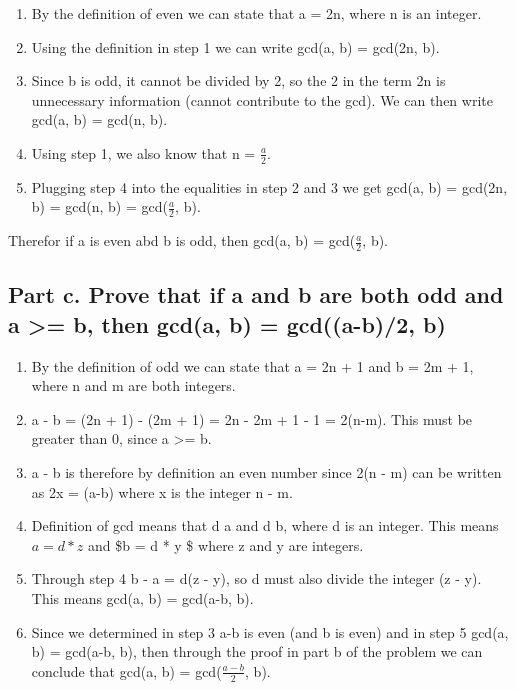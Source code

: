 \documentclass[]{article}
\providecommand{\tightlist}{%
  \setlength{\itemsep}{0pt}\setlength{\parskip}{0pt}}
\begin{document}
\begin{enumerate}
\def\labelenumi{\arabic{enumi}.}
\tightlist
\item
  By the definition of even we can state that a = 2n, where n is an
  integer.
\item
  Using the definition in step 1 we can write gcd(a, b) = gcd(2n, b).
\item
  Since b is odd, it cannot be divided by 2, so the 2 in the term 2n is
  unnecessary information (cannot contribute to the gcd). We can then
  write gcd(a, b) = gcd(n, b).
\item
  Using step 1, we also know that n = \(\frac{a}{2}\).
\item
  Plugging step 4 into the equalities in step 2 and 3 we get gcd(a, b) =
  gcd(2n, b) = gcd(n, b) = gcd(\(\frac{a}{2}\), b).
\end{enumerate}

Therefor if a is even abd b is odd, then gcd(a, b) =
gcd(\(\frac{a}{2}\), b).

\pagebreak

\subsection{Part c. Prove that if a and b are both odd and a
\textgreater{}= b, then gcd(a, b) = gcd((a-b)/2,
b)}\label{part-c.-prove-that-if-a-and-b-are-both-odd-and-a-b-then-gcda-b-gcda-b2-b}

\begin{enumerate}
\def\labelenumi{\arabic{enumi}.}
\tightlist
\item
  By the definition of odd we can state that a = 2n + 1 and b = 2m + 1,
  where n and m are both integers.
\item
  a - b = (2n + 1) - (2m + 1) = 2n - 2m + 1 - 1 = 2(n-m). This must be
  greater than 0, since a \textgreater{}= b.
\item
  a - b is therefore by definition an even number since 2(n - m) can be
  written as 2x = (a-b) where x is the integer n - m.
\item
  Definition of gcd means that d \textbar{} a and d \textbar{} b, where
  d is an integer. This means \(a = d * z\) and \$b = d * y \$ where z
  and y are integers.
\item
  Through step 4 b - a = d(z - y), so d must also divide the integer (z
  - y). This means gcd(a, b) = gcd(a-b, b).
\item
  Since we determined in step 3 a-b is even (and b is even) and in step
  5 gcd(a, b) = gcd(a-b, b), then through the proof in part b of the
  problem we can conclude that gcd(a, b) = gcd(\(\frac{a-b}2\), b).
\end{enumerate}
\end{document}
